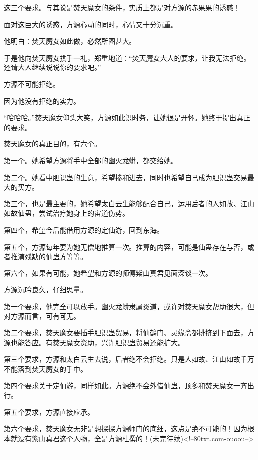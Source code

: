 \begin{this_body}
这三个要求。与其说是焚天魔女的条件，实质上都是对方源的赤果果的诱惑！

面对这巨大的诱惑，方源心动的同时，心情又十分沉重。

他明白：焚天魔女如此做，必然所图甚大。

于是他向焚天魔女拱手一礼，郑重地道：“焚天魔女大人的要求，让我无法拒绝。还请大人继续说说你的要求吧。”

方源不可能拒绝。

因为他没有拒绝的实力。

“哈哈哈。”焚天魔女仰头大笑，方源如此识时务，让她很是开怀。她终于提出真正的要求。

焚天魔女的真正目的，有六个。

第一个。她希望方源将手中全部的幽火龙蟒，都交给她。

第二个。她看中胆识蛊的生意，希望掺和进去，同时也希望自己成为胆识蛊交易最大的买方。

第三个，也是最主要的，她希望太白云生能够配合自己，运用后者的人如故、江山如故仙蛊，尝试治疗她身上的宙道伤势。

第四个，希望今后能借用方源的定仙游，回到东海。

第五个，方源每年要为她无偿地推算一次。推算的内容，可能是仙蛊存在与否，或者推演残缺的仙蛊方等等。

第六个，如果有可能，她希望和方源的师傅紫山真君见面深谈一次。

方源沉吟良久，仔细思量。

第一个要求，他完全可以放手。幽火龙蟒隶属炎道，或许对焚天魔女帮助很大，但对方源而言，可有可无。

第二个要求，焚天魔女要插手胆识蛊贸易，将仙鹤门、灵缘斋都排挤到下面去，方源也能答应。有焚天魔女资助，兴许胆识蛊贸易还能扩大。

第三个要求，方源和太白云生去说，后者绝不会拒绝。只是人如故、江山如故千万不能落到焚天魔女的手中。

第四个要求关于定仙游，同样如此。方源绝不会外借仙蛊，顶多和焚天魔女一齐出行。

第五个要求，方源直接应承。

第六个要求，焚天魔女无非是想探探方源师门的底细，这点是绝不可能的！因为根本就没有紫山真君这个人物，全是方源杜撰的！(未完待续)<!--80txt.com-ouoou-->

------------

\end{this_body}

